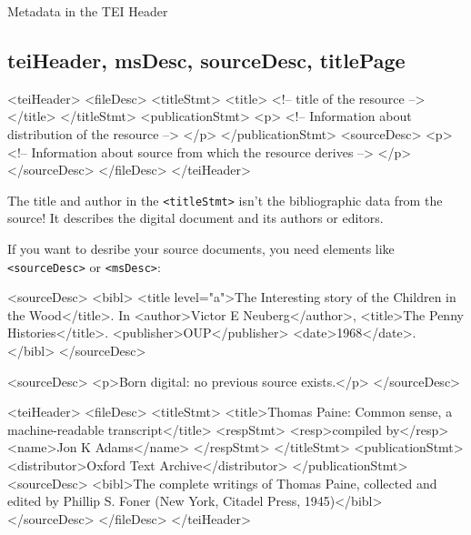 \begin{frame}{Metadata in the TEI Header}
\subsection{teiHeader, msDesc, sourceDesc, titlePage}
\small

\begin{xmlcode}
<teiHeader>
 <fileDesc>
  <titleStmt>
   <title>
<!-- title of the resource -->
   </title>
  </titleStmt>
  <publicationStmt>
   <p>
<!-- Information about distribution of the resource -->
   </p>
  </publicationStmt>
  <sourceDesc>
   <p>
<!-- Information about source from which the resource derives -->
   </p>
  </sourceDesc>
 </fileDesc>
</teiHeader>
\end{xmlcode}


The title and author in the \texttt{<titleStmt>} isn't the bibliographic data from the source! It describes the digital document and its authors or editors.

If you want to desribe your source documents, you need elements like \texttt{<sourceDesc>} or \texttt{<msDesc>}:
\begin{xmlcode}
<sourceDesc>
 <bibl>
  <title level="a">The Interesting story of the Children in the Wood</title>. In
 <author>Victor E Neuberg</author>, <title>The Penny Histories</title>.
 <publisher>OUP</publisher>
  <date>1968</date>. </bibl>
</sourceDesc>
\end{xmlcode}

\begin{xmlcode}
<sourceDesc>
 <p>Born digital: no previous source exists.</p>
</sourceDesc>
\end{xmlcode}

\begin{xmlcode}
<teiHeader>
 <fileDesc>
  <titleStmt>
   <title>Thomas Paine: Common sense, a
       machine-readable transcript</title>
   <respStmt>
    <resp>compiled by</resp>
    <name>Jon K Adams</name>
   </respStmt>
  </titleStmt>
  <publicationStmt>
   <distributor>Oxford Text Archive</distributor>
  </publicationStmt>
  <sourceDesc>
   <bibl>The complete writings of Thomas Paine, collected and edited
       by Phillip S. Foner (New York, Citadel Press, 1945)</bibl>
  </sourceDesc>
 </fileDesc>
</teiHeader>
\end{xmlcode}

\end{frame}

